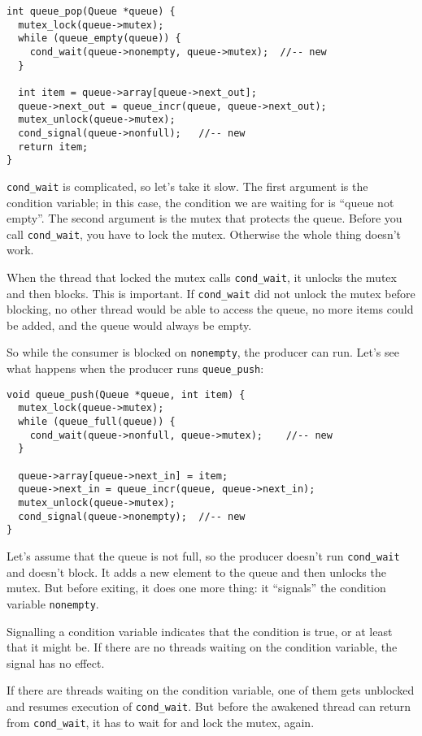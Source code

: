 \documentclass[12pt]{book}
\begin{document}
\begin{verbatim}
int queue_pop(Queue *queue) {
  mutex_lock(queue->mutex);
  while (queue_empty(queue)) {
    cond_wait(queue->nonempty, queue->mutex);  //-- new
  }
  
  int item = queue->array[queue->next_out];
  queue->next_out = queue_incr(queue, queue->next_out);
  mutex_unlock(queue->mutex);
  cond_signal(queue->nonfull);   //-- new
  return item;
}
\end{verbatim}

\verb"cond_wait" is complicated, so let's take it slow.  
The first argument is the condition variable; in this case,
the condition we are waiting for is ``queue not empty''.  The second
argument is the mutex that protects the queue.  Before you
call \verb"cond_wait", you have to lock the mutex.  Otherwise the
whole thing doesn't work.

When the thread that locked the mutex calls \verb"cond_wait", it
unlocks the mutex and then blocks.  This is important.  If
\verb"cond_wait" did not unlock the mutex before blocking, no
other thread would be able to access the queue, no more items
could be added, and the queue would always be empty.

So while the consumer is blocked on {\tt nonempty}, the producer can
run.  Let's see what happens when the producer runs \verb"queue_push":

\begin{verbatim}
void queue_push(Queue *queue, int item) {
  mutex_lock(queue->mutex);
  while (queue_full(queue)) {
    cond_wait(queue->nonfull, queue->mutex);    //-- new
  }
  
  queue->array[queue->next_in] = item;
  queue->next_in = queue_incr(queue, queue->next_in);
  mutex_unlock(queue->mutex);
  cond_signal(queue->nonempty);  //-- new
}
\end{verbatim}

Let's assume that the queue is not full, so the producer doesn't
run \verb"cond_wait" and doesn't block.  It adds a new element
to the queue and then unlocks the mutex.  But before exiting,
it does one more thing: it ``signals'' the condition variable
{\tt nonempty}.

Signalling a condition variable indicates that the condition is
true, or at least that it might be.  If there are no threads waiting
on the condition variable, the signal has no effect.

If there are threads waiting on the condition variable, one of them
gets unblocked and resumes execution of \verb"cond_wait".  But before
the awakened thread can return from \verb"cond_wait", it has
to wait for and lock the mutex, again.
\end{document}
